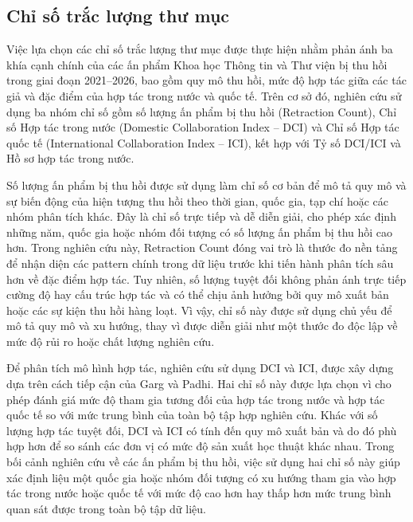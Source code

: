 \subsection{Chỉ số trắc lượng thư mục}

Việc lựa chọn các chỉ số trắc lượng thư mục được thực hiện nhằm phản ánh ba khía cạnh chính của các ấn phẩm Khoa học Thông tin và Thư viện bị thu hồi trong giai đoạn 2021--2026, bao gồm quy mô thu hồi, mức độ hợp tác giữa các tác giả và đặc điểm của hợp tác trong nước và quốc tế. Trên cơ sở đó, nghiên cứu sử dụng ba nhóm chỉ số gồm số lượng ấn phẩm bị thu hồi (Retraction Count), Chỉ số Hợp tác trong nước (Domestic Collaboration Index -- DCI) và Chỉ số Hợp tác quốc tế (International Collaboration Index -- ICI), kết hợp với Tỷ số DCI/ICI và Hồ sơ hợp tác trong nước.

Số lượng ấn phẩm bị thu hồi được sử dụng làm chỉ số cơ bản để mô tả quy mô và sự biến động của hiện tượng thu hồi theo thời gian, quốc gia, tạp chí hoặc các nhóm phân tích khác. Đây là chỉ số trực tiếp và dễ diễn giải, cho phép xác định những năm, quốc gia hoặc nhóm đối tượng có số lượng ấn phẩm bị thu hồi cao hơn. Trong nghiên cứu này, Retraction Count đóng vai trò là thước đo nền tảng để nhận diện các pattern chính trong dữ liệu trước khi tiến hành phân tích sâu hơn về đặc điểm hợp tác. Tuy nhiên, số lượng tuyệt đối không phản ánh trực tiếp cường độ hay cấu trúc hợp tác và có thể chịu ảnh hưởng bởi quy mô xuất bản hoặc các sự kiện thu hồi hàng loạt. Vì vậy, chỉ số này được sử dụng chủ yếu để mô tả quy mô và xu hướng, thay vì được diễn giải như một thước đo độc lập về mức độ rủi ro hoặc chất lượng nghiên cứu.

Để phân tích mô hình hợp tác, nghiên cứu sử dụng DCI và ICI, được xây dựng dựa trên cách tiếp cận của Garg và Padhi. Hai chỉ số này được lựa chọn vì cho phép đánh giá mức độ tham gia tương đối của hợp tác trong nước và hợp tác quốc tế so với mức trung bình của toàn bộ tập hợp nghiên cứu. Khác với số lượng hợp tác tuyệt đối, DCI và ICI có tính đến quy mô xuất bản và do đó phù hợp hơn để so sánh các đơn vị có mức độ sản xuất học thuật khác nhau. Trong bối cảnh nghiên cứu về các ấn phẩm bị thu hồi, việc sử dụng hai chỉ số này giúp xác định liệu một quốc gia hoặc nhóm đối tượng có xu hướng tham gia vào hợp tác trong nước hoặc quốc tế với mức độ cao hơn hay thấp hơn mức trung bình quan sát được trong toàn bộ tập dữ liệu.

